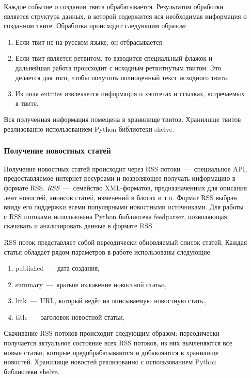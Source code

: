         Каждое событие о создании твита обрабатывается.
        Результатом обработки является структура данных, в которой содержится вся необходимая информация о созданном твите.
        Обработка происходит следующим образом:
        \begin{enumerate}
            \item Если твит не на русском языке, он отбрасывается.
            \item Если твит является ретвитом, то взводится специальный флажок и дальнейшая работа происходит с исходным ретвитнутым твитом.
            Это делается для того, чтобы получить полноценный текст исходного твита.
            \item Из поля entities извлекается информация о хэштегах и ссылках, встречаемых в твите.
        \end{enumerate}
        Вся полученная информация помещена в хранилище твитов. Хранилище твитов реализованно использованием Python библиотеки shelve.

    \subsubsection{Получение новостных статей}
        Получение новостных статей происходит через RSS потоки~---~специальное API, предоставляемое интернет ресурсами и позволяющее получать информацию в формате RSS.
        \textit{RSS}~---~семейство XML-форматов, предназначенных для описания лент новостей, анонсов статей, изменений в блогах и т.п.
        Формат RSS выбран ввиду его поддержки всеми популярными новостными источниками.
        Для работы с RSS потоками использована Python библиотека feedparser, позволяющая скачивать и анализировать данные в формате RSS.

        RSS поток представляет собой переодически обновляемый список статей. Каждая статья обладает рядом параметров в работе использованы следующие:
        \begin{enumerate}
            \item published~---~дата создания,
            \item summary~---~краткое изложение новостной статьи,
            \item link~---~URL, который ведёт на описываемую новостную стать.,
            \item title~---~заголовок новостной статьи,
        \end{enumerate}

        Скачивание RSS потоков происходит следующим образом: переодически получается актуальное состояние всех RSS потоков, из них вычленяются все новые статьи,
        которые предобрабатываются и добавляются в хранилище новостей. Хранилище новостей реализованно с использованием Python библиотеки shelve.

